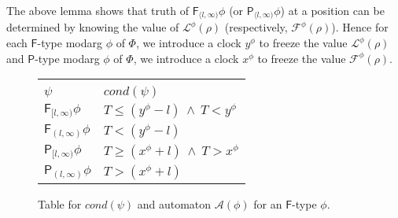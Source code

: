 \documentclass{llncs}
\newcommand{\fut}{\textsf{F}}
\newcommand{\past}{\textsf{P}}
\newcommand{\rend}{\triangleleft}
\newcommand{\lend}{\triangleright}
\newcommand{\autm}{\mathcal A}
\newcommand{\frst}{{\mathcal F}}
\newcommand{\lst}{{\mathcal L}}
\begin{document}
The above lemma shows that truth of $\fut_{\langle l , \infty)} \phi$ (or $\past_{\langle l , \infty)} \phi$) at a position can be determined by knowing the value of $\lst^\phi(\rho)$ (respectively, $\frst^\phi(\rho)$). Hence for each $\fut$-type modarg $\phi$ of $\Phi$, we introduce a clock $y^\phi$ to freeze the value $\lst^{\phi}(\rho)$ and $\past$-type modarg $\phi$ of $\Phi$, we introduce a clock $x^\phi$ to freeze the value $\frst^{\phi}(\rho)$.

\begin{figure}
\begin{minipage}{0.4\linewidth}
\begin{tabular}{|l|l|}
\hline
&\\
[-1.5ex]
$\psi$ & $cond(\psi)$ \\ 
\hline
$\fut_{[l,\infty)}\phi$ & $T \leq  (y^\phi - l) ~\land~ T<y^\phi$ \\ 
\hline 
$\fut_{(l,\infty)}\phi$ & $ T <  (y^\phi - l)$ \\ 
\hline 
$\past_{[l,\infty)}\phi$ & $ T \geq  (x^\phi + l) ~\land ~T>x^\phi$ \\ 
\hline 
$\past_{(l,\infty)}\phi$ & $ T >  (x^\phi + l)$ \\ 
\hline 
\end{tabular}
\end{minipage}
\begin{minipage}{0.5\linewidth}
\end{minipage}
\caption{Table for $cond(\psi)$ and automaton $\autm(\phi)$ for an $\fut$-type $\phi$.}
\label{fig:infty}
\end{figure}
\end{document}
